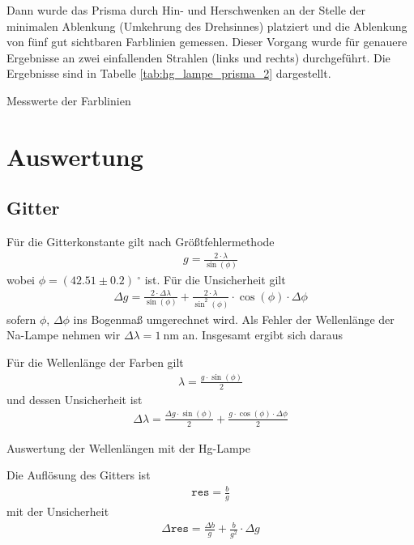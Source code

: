 \documentclass{article}
\begin{document}
Dann wurde das Prisma durch Hin- und Herschwenken an der Stelle der minimalen Ablenkung (Umkehrung des Drehsinnes) platziert und die Ablenkung von fünf gut sichtbaren Farblinien gemessen. Dieser Vorgang wurde für genauere Ergebnisse an zwei einfallenden Strahlen (links und rechts) durchgeführt. Die Ergebnisse sind in Tabelle \ref{tab:hg_lampe_prisma_2} dargestellt.

\begin{table}[H]
\caption{Messwerte der Farblinien}
\label{tab:hg_lampe_prisma_2}
\centering

\end{table}


\section{Auswertung}

\subsection{Gitter}
Für die Gitterkonstante gilt nach Größtfehlermethode
\begin{align*}
g = \frac{2\cdot \lambda}{\sin(\phi)}
\end{align*}
 wobei $\phi = (42.51 \pm 0.2) ~^\circ$ ist. Für die Unsicherheit gilt
\begin{align*}
\Delta g = \frac{2\cdot\Delta \lambda}{\sin(\phi)} + \frac{2\cdot\lambda}{\sin^2(\phi)}\cdot \cos(\phi)\cdot \Delta\phi
\end{align*}
sofern $\phi$, $\Delta\phi$ ins Bogenmaß umgerechnet wird. Als Fehler der Wellenlänge der Na-Lampe nehmen wir $\Delta\lambda = 1~$nm an. Insgesamt ergibt sich daraus 




Für die Wellenlänge der Farben gilt
\begin{align*}
\lambda = \frac{g\cdot \sin(\phi)}{2}
\end{align*}
und dessen Unsicherheit ist
\begin{align*}
\Delta \lambda = \frac{\Delta g\cdot \sin(\phi)}{2} + \frac{g\cdot \cos(\phi)\cdot \Delta\phi}{2}
\end{align*}



\begin{table}[H]
\caption{Auswertung der Wellenlängen mit der Hg-Lampe}
\label{tab:hg_lampe_auswertung}
\centering

\end{table}


Die Auflösung des Gitters ist
\begin{align*}
\texttt{res} = \frac{b}{g} 
\end{align*}
mit der Unsicherheit
\begin{align*}
\Delta\texttt{res} = \frac{\Delta b}{g} + \frac{b}{g^2}\cdot\Delta g
\end{align*}
\end{document}
